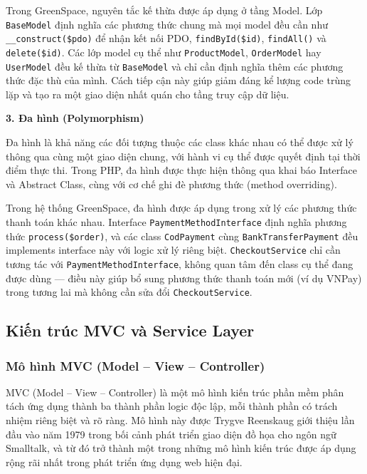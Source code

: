 \documentclass[11pt, a4paper]{article}
\begin{document}
Trong GreenSpace, nguyên tắc kế thừa được áp dụng ở tầng Model. Lớp \texttt{BaseModel} định nghĩa các phương thức chung mà mọi model đều cần như \texttt{\_\_construct(\$pdo)} để nhận kết nối PDO, \texttt{findById(\$id)}, \texttt{findAll()} và \texttt{delete(\$id)}. Các lớp model cụ thể như \texttt{ProductModel}, \texttt{OrderModel} hay \texttt{UserModel} đều kế thừa từ \texttt{BaseModel} và chỉ cần định nghĩa thêm các phương thức đặc thù của mình. Cách tiếp cận này giúp giảm đáng kể lượng code trùng lặp và tạo ra một giao diện nhất quán cho tầng truy cập dữ liệu.

\textbf{3. Đa hình (Polymorphism)}

Đa hình là khả năng các đối tượng thuộc các class khác nhau có thể được xử lý thông qua cùng một giao diện chung, với hành vi cụ thể được quyết định tại thời điểm thực thi. Trong PHP, đa hình được thực hiện thông qua khai báo Interface và Abstract Class, cùng với cơ chế ghi đè phương thức (method overriding).

Trong hệ thống GreenSpace, đa hình được áp dụng trong xử lý các phương thức thanh toán khác nhau. Interface \texttt{PaymentMethodInterface} định nghĩa phương thức \texttt{process(\$order)}, và các class \texttt{CodPayment} cùng \texttt{BankTransferPayment} đều implements interface này với logic xử lý riêng biệt. \texttt{CheckoutService} chỉ cần tương tác với \texttt{PaymentMethodInterface}, không quan tâm đến class cụ thể đang được dùng --- điều này giúp bổ sung phương thức thanh toán mới (ví dụ VNPay) trong tương lai mà không cần sửa đổi \texttt{CheckoutService}.

\subsection{Kiến trúc MVC và Service Layer}

\subsubsection{Mô hình MVC (Model -- View -- Controller)}

MVC (Model -- View -- Controller) là một mô hình kiến trúc phần mềm phân tách ứng dụng thành ba thành phần logic độc lập, mỗi thành phần có trách nhiệm riêng biệt và rõ ràng. Mô hình này được Trygve Reenskaug giới thiệu lần đầu vào năm 1979 trong bối cảnh phát triển giao diện đồ họa cho ngôn ngữ Smalltalk, và từ đó trở thành một trong những mô hình kiến trúc được áp dụng rộng rãi nhất trong phát triển ứng dụng web hiện đại.
\end{document}
